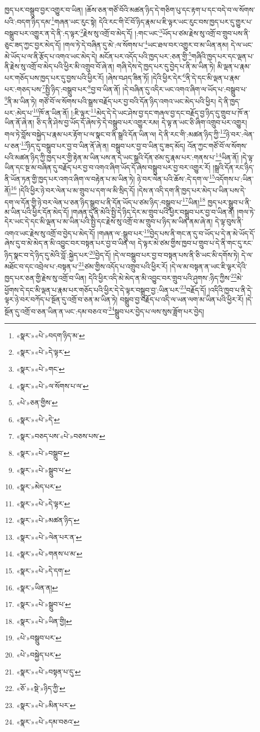 ཁྱད་པར་བསྒྲུབ་བྱར་འགྱུར་བ་ཡིན། །ཆོས་ཅན་གཙོ་བོའི་མཚན་ཉིད་དེ་གཅིག་པུ་དང་རྟག་པ་དང་བདེ་བ་ལ་སོགས་པའི་:བདག་ཉིད་དམ་\footnote{«སྣར་»«པེ་»བདག་ཉིད་མ་}གཞན་ཡང་རུང་སྟེ། དེའི་རང་གི་ངོ་བོ་ཉིད་རྣམ་པ་ཇི་ལྟར་ཡང་རུང་བས་ཁྱད་པར་དུ་གྱུར་པ་བསྒྲུབ་པར་འགྱུར་ན་དེ་ནི་:ད་ལྟར་\footnote{«སྣར་»«པེ་»དེ་ལྟར་}རྗེས་སུ་འགྲོ་བ་མེད་དོ། །:གང་ཡང་\footnote{«སྣར་»«པེ་»གང་}ཡོད་པ་ཙམ་རྗེས་སུ་འགྲོ་བ་གྲུབ་པས་ནི་ཅུང་ཟད་ཀྱང་བྱར་མེད་དོ། །གལ་ཏེ་དེ་བཞིན་དུ་མེ་:ལ་སོགས་པ་\footnote{«སྣར་»«པེ་»ལ་སོགས་པ་ལ་}ཡང་ཐལ་བར་འགྱུར་བ་མ་ཡིན་ནམ། དེ་ལ་ཡང་མེ་ཡོད་པ་ལ་ནི་རྩོད་པ་འགའ་ཡང་མེད་དེ། མངོན་པར་འདོད་པའི་ཁྱད་པར་:ཅན་གྱི་\footnote{«པེ་»ཅན་གྱིས་}གཞིའི་ཁྱད་པར་དང་ལྡན་པ་ནི་རྗེས་སུ་འགྲོ་བ་མེད་པའི་ཕྱིར་མི་འགྲུབ་བོ་ཞེ་ན། གཞི་དེས་དེ་ཁྱད་པར་དུ་བྱེད་པ་ནི་མ་ཡིན་ཏེ། མི་ལྡན་པ་རྣམ་པར་གཅོད་པས་ཁྱད་པར་དུ་བྱས་པའི་ཕྱིར་རོ། །ཞེས་བཤད་ཟིན་ཏོ། །དེའི་ཕྱིར་དེར་\footnote{«སྣར་»«པེ་»དེ་}ནི་དེ་དང་མི་ལྡན་པ་རྣམ་པར་:གཅད་པས་\footnote{«སྣར་»བཅད་པས་«པེ་»བཅས་པས་}སྤྱི་ཉིད་:བསྒྲུབ་པར་\footnote{«སྣར་»«པེ་»བསྒྲུབ་}བྱ་བ་ཡིན་ནོ། །དེ་བཞིན་དུ་འདིར་ཡང་འགའ་ཞིག་ལ་ཡོད་པ་:བསྒྲུབ་པ་\footnote{«སྣར་»«པེ་»སྒྲུབ་པ་}ནི་མ་ཡིན་ཏེ། གཙོ་བོ་ལ་སོགས་པའི་སྒྲས་བརྗོད་པར་བྱ་བའི་དོན་ཉིད་འགའ་ཡང་མེད་པའི་ཕྱིར། དེ་ནི་ཁྱད་པར་:མེད་པ་\footnote{«སྣར་»མེད་པར་}ཁོ་ན་ཡིན་ནོ། །:ཇི་ལྟར་\footnote{«སྣར་»«པེ་»དེ་ལྟར་}མེད་དེ་དེ་ཡང་ཤེས་བྱ་དང་གཞལ་བྱ་དང་བརྗོད་བྱ་ཉིད་དུ་གྲུབ་པ་ཁོ་ན་ཡིན་ནོ་ཞེ་ན། ཅི་ད་ནི་ཤེས་བྱ་ཡོད་དོ་ཞེས་ཏེ་དེ་བསྒྲུབ་པར་འགྱུར་རམ། དེ་ལྟ་ན་ཡང་ཅི་ཞིག་འགྲུབ་པར་འགྱུར། གལ་ཏེ་བློས་བསྐྱེད་པ་རྣམ་པར་རྟོག་པ་ལ་སྣང་བ་ནི་སྒྲའི་དོན་ཡིན་ལ། དེ་ནི་རང་གི་:མཚན་ཉིད་ཀྱི་\footnote{«སྣར་»«པེ་»མཚན་ཉིད་}ཉེ་བར་:ལེན་པ་ཅན་\footnote{«སྣར་»«པེ་»ལེན་པར་ན་}ཉིད་དུ་བསྒྲུབ་པར་བྱ་བ་ཡིན་ནོ་ཞེ་ན། བསྒྲུབ་པར་བྱ་བ་ཡིན་དུ་ཟད་མོད། འོན་ཀྱང་གཙོ་བོ་ལ་སོགས་པའི་མཚན་ཉིད་ཀྱི་ཁྱད་པར་གྱི་རྟེན་མ་ཡིན་པས་ན་དེ་ཡང་སྒྲའི་དོན་ཙམ་དུ་རྣམ་པར་:གནས་པ་\footnote{«སྣར་»«པེ་»གནས་པ་མ་}ཡིན་ནོ། །དེ་ལྟ་ཡིན་དང་སྔ་མ་བཞིན་དུ་བརྗོད་པར་བྱ་བ་འགའ་ཞིག་ཡོད་དོ་ཞེས་བསྒྲུབ་པར་བྱ་བར་འགྱུར་རོ། །སྒྲའི་དོན་རང་ཉིད་ནི་ཡོན་ཏན་གྱི་ཁྱད་པར་འགའ་ཞིག་ལ་བརྟེན་པ་མ་ཡིན་ཏེ། ཉེ་བར་ལེན་པའི་ཆོས་:དེ་དག་ལ་\footnote{«སྣར་»«པེ་»དེ་དག་}འདོགས་པ་:ཡིན་ནོ།\footnote{«སྣར་»ཡིན་ན།} །དེའི་ཕྱིར་ཉེ་བར་ལེན་པ་མ་གྲུབ་པ་དག་ལ་མི་སྲིད་དོ། །དེས་ན་འདི་དག་ནི་ཁྱད་པར་མེད་པ་ཡིན་པས་དེ་དག་ལ་དོན་གྱི་ཉེ་བར་ལེན་པ་ཅན་ཉིད་སྒྲུབ་པ་ནི་དོན་ཡོད་པ་ཙམ་ཉིད་:བསྒྲུབ་པ་\footnote{«སྣར་»«པེ་»སྒྲུབ་པ་}ཡིན།\footnote{«སྣར་»«པེ་»ཡིན་གྱི།} ཁྱད་པར་སྒྲུབ་པ་ནི་མ་ཡིན་པའི་ཕྱིར་དོན་མེད་དོ། །གཞན་དུ་ནི་མེའི་སྤྱི་དེ་ཉིད་དེར་མ་གྲུབ་པའི་ཕྱིར་བསྒྲུབ་པར་བྱ་བ་ཡིན་ནོ། །གལ་ཏེ་དེར་ཡང་དེ་དང་མི་ལྡན་པ་མ་ཡིན་པའི་སྤྱི་དང་རྗེས་སུ་འགྲོ་བ་མ་གྲུབ་པ་ཉིད་མ་ཡིན་ནམ་ཞེ་ན། དེ་ལྟ་བུས་ནི་འགའ་ཡང་རྗེས་སུ་འགྲོ་བ་བྱེད་པ་མེད་དོ། །གཞན་ལ་:སྒྲུབ་པར་\footnote{«པེ་»བསྒྲུབ་པར་}བྱེད་པས་ནི་གང་ན་དུ་བ་ཡོད་པ་དེ་ན་མེ་ཡོད་དོ་ཞེས་དུ་བ་མེ་མེད་ན་མི་འབྱུང་བར་བསྟན་པར་བྱ་བ་ཡིན་ལ། དེ་ལྟར་མེ་ཙམ་གྱིས་ཁྱབ་པ་གྲུབ་པ་དེ་ནི་གང་དུ་རང་ཉིད་སྣང་བ་དེ་ཉིད་དུ་མེའི་བློ་:སྐྱེད་པར་\footnote{«པེ་»བསྐྱེད་པར་}བྱེད་དོ། །དེ་ལ་བསྒྲུབ་པར་བྱ་བ་བསྟན་པས་ནི་ཅི་ཡང་མི་དགོས་ཏེ། དེ་ལ་མཐོང་བ་དང་འབྲེལ་པ་:བསྟན་པ་\footnote{«སྣར་»«པེ་»བསྟན་པ་དུ་}ཙམ་གྱིས་འདོད་པ་འགྲུབ་པའི་ཕྱིར་རོ། །དེ་ལ་མ་བསྟན་ན་ཡང་ཇི་ལྟར་དེའི་ཁྱད་པར་ཅན་གྱི་རྗེས་སུ་འགྲོ་བ་ཡིན། དེའི་ཕྱིར་འདི་མེ་མེད་ན་མི་འབྱུང་བར་གྲུབ་པའི་ཤུགས་:ཉིད་ཀྱིས་\footnote{«ཅོ་»«སྡེ་»ཉིད་ཀྱི་}མེ་ཕྱོགས་དེ་དང་མི་ལྡན་པ་རྣམ་པར་གཅོད་པའི་ཕྱིར་དེ་དེ་ལྟར་བསྒྲུབ་བྱ་:ཡིན་པར་\footnote{«སྣར་»«པེ་»མིན་པར་}བརྗོད་དོ། །འདིའི་ཁྱབ་པ་ནི་དེ་ལྟར་ཉེ་བར་བཀོད་པ་སྔོན་དུ་འགྲོ་བ་ཅན་མ་ཡིན་ཏེ། བསྒྲུབ་བྱ་བརྗོད་པ་འདི་ལ་ཡན་ལག་མ་ཡིན་པའི་ཕྱིར་རོ། །དེ་སྔོན་དུ་འགྲོ་བ་ཅན་ཡིན་ན་ཡང་:དམ་བཅའ་བ་\footnote{«སྣར་»«པེ་»དམ་བཅའ་}སྒྲུབ་པར་བྱེད་པ་ལས་སུས་ཟློག་པར་བྱེད། 